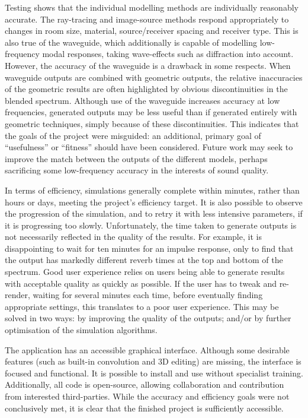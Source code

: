 \documentclass[]{scrreprt}
\begin{document}
Testing shows that the individual modelling methods are individually
reasonably accurate. The ray-tracing and image-source methods respond
appropriately to changes in room size, material, source/receiver spacing
and receiver type. This is also true of the waveguide, which
additionally is capable of modelling low-frequency modal responses,
taking wave-effects such as diffraction into account. However, the
accuracy of the waveguide is a drawback in some respects. When waveguide
outputs are combined with geometric outputs, the relative inaccuracies
of the geometric results are often highlighted by obvious
discontinuities in the blended spectrum. Although use of the waveguide
increases accuracy at low frequencies, generated outputs may be less
useful than if generated entirely with geometric techniques, simply
because of these discontinuities. This indicates that the goals of the
project were misguided: an additional, primary goal of ``usefulness'' or
``fitness'' should have been considered. Future work may seek to improve
the match between the outputs of the different models, perhaps
sacrificing some low-frequency accuracy in the interests of sound
quality.

In terms of efficiency, simulations generally complete within minutes,
rather than hours or days, meeting the project's efficiency target. It
is also possible to observe the progression of the simulation, and to
retry it with less intensive parameters, if it is progressing too
slowly. Unfortunately, the time taken to generate outputs is not
necessarily reflected in the quality of the results. For example, it is
disappointing to wait for ten minutes for an impulse response, only to
find that the output has markedly different reverb times at the top and
bottom of the spectrum. Good user experience relies on users being able
to generate results with acceptable quality as quickly as possible. If
the user has to tweak and re-render, waiting for several minutes each
time, before eventually finding appropriate settings, this translates to
a poor user experience. This may be solved in two ways: by improving the
quality of the outputs; and/or by further optimisation of the simulation
algorithms.

The application has an accessible graphical interface. Although some
desirable features (such as built-in convolution and 3D editing) are
missing, the interface is focused and functional. It is possible to
install and use without specialist training. Additionally, all code is
open-source, allowing collaboration and contribution from interested
third-parties. While the accuracy and efficiency goals were not
conclusively met, it is clear that the finished project is sufficiently
accessible.
\end{document}
